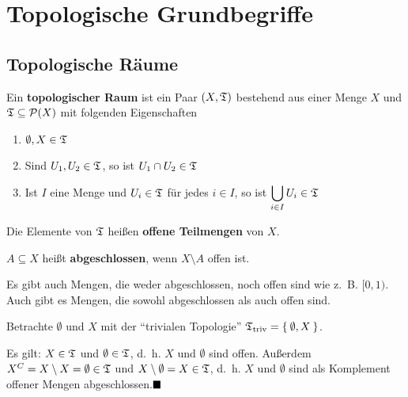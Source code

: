\chapter{Topologische Grundbegriffe}
\section{Topologische Räume}
\begin{definition}   
    Ein \textbf{topologischer Raum} ist ein Paar $(X, \mathfrak{T})$ bestehend
    aus einer Menge $X$ und $\mathfrak{T} \subseteq \mathcal{P}(X)$ mit
    folgenden Eigenschaften
    \begin{enumerate}[label=(\roman*)]
        \item $\emptyset, X \in \mathfrak{T}$
        \item Sind $U_1, U_2 \in \mathfrak{T}$, so ist $U_1 \cap U_2 \in \mathfrak{T}$
        \item Ist $I$ eine Menge und $U_i \in \mathfrak{T}$ für jedes $i \in I$,
              so ist $\displaystyle \bigcup_{i \in I} U_i \in \mathfrak{T}$
    \end{enumerate}
    Die Elemente von $\mathfrak{T}$ heißen \textbf{offene Teilmengen} von $X$. 

    $A \subseteq X$ heißt \textbf{abgeschlossen}, wenn $X \setminus A$ offen ist.

\end{definition}

Es gibt auch Mengen, die weder abgeschlossen, noch offen sind wie z.~B. $[0,1)$.
Auch gibt es Mengen, die sowohl abgeschlossen als auch offen sind.

\begin{korollar}
    Betrachte $\emptyset$ und $X$ mit der \enquote{trivialen Topologie}
     $\mathfrak{T}_{\textnormal{triv}} = \Set{\emptyset, X}$.

    Es gilt: $X \in \mathfrak{T}$ und $\emptyset \in \mathfrak{T}$, d.~h. $X$ und $\emptyset$
    sind offen. Außerdem $X^C = X \setminus X = \emptyset \in \mathfrak{T}$
    und $X \setminus \emptyset = X \in \mathfrak{T}$, d.~h. $X$ und $\emptyset$
    sind als Komplement offener Mengen abgeschlossen.$\qed$
\end{korollar}

